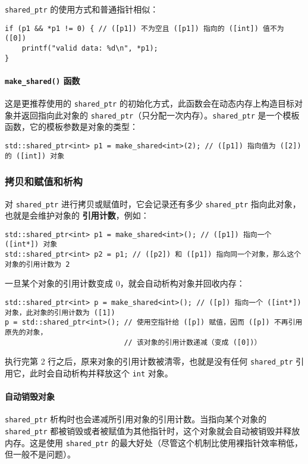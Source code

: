\documentclass[hyperref,UTF8]{article}
\begin{document}
\texttt{shared\_ptr} 的使用方式和普通指针相似：
\begin{lstlisting}
if (p1 && *p1 != 0) { // ([p1]) 不为空且 ([p1]) 指向的 ([int]) 值不为 ([0])
    printf("valid data: %d\n", *p1);
}
\end{lstlisting}

\paragraph{\texttt{make\_shared()} 函数}

这是更推荐使用的 \texttt{shared\_ptr} 的初始化方式，此函数会在动态内存上构造目标对象并返回指向此对象的 \texttt{shared\_ptr}（只分配一次内存）。\texttt{shared\_ptr} 是一个模板函数，它的模板参数是对象的类型：
\begin{lstlisting}[numbers=none]
std::shared_ptr<int> p1 = make_shared<int>(2); // ([p1]) 指向值为 ([2]) 的 ([int]) 对象
\end{lstlisting}

\subsubsection{拷贝和赋值和析构}

对 \texttt{shared\_ptr} 进行拷贝或赋值时，它会记录还有多少 \texttt{shared\_ptr} 指向此对象，也就是会维护对象的 \textbf{引用计数}，例如：
\begin{lstlisting}[numbers=none]
std::shared_ptr<int> p1 = make_shared<int>(); // ([p1]) 指向一个 ([int*]) 对象
std::shared_ptr<int> p2 = p1; // ([p2]) 和 ([p1]) 指向同一个对象，那么这个对象的引用计数为 2
\end{lstlisting}

一旦某个对象的引用计数变成 0，就会自动析构对象并回收内存：
\begin{lstlisting}[numbers=none]
std::shared_ptr<int> p = make_shared<int>(); // ([p]) 指向一个 ([int*]) 对象，此对象的引用计数为 ([1])
p = std::shared_ptr<int>(); // 使用空指针给 ([p]) 赋值，因而 ([p]) 不再引用原先的对象，
                            // 该对象的引用计数递减（变成 ([0])）
\end{lstlisting}
执行完第 2 行之后，原来对象的引用计数被清零，也就是没有任何 \texttt{shared\_ptr} 引用它，此时会自动析构并释放这个 \texttt{int} 对象。

\paragraph{自动销毁对象}

\texttt{shared\_ptr} 析构时也会递减所引用对象的引用计数。当指向某个对象的 \texttt{shared\_ptr} 都被销毁或者被赋值为其他指针时，这个对象就会自动被销毁并释放内存。这是使用 \texttt{shared\_ptr} 的最大好处（尽管这个机制比使用裸指针效率稍低，但一般不是问题）。
\end{document}
